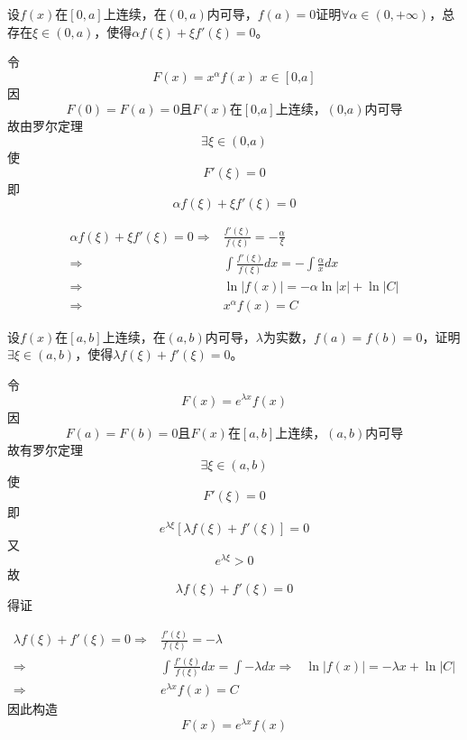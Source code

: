 \begin{example}
	设$f(x)$在$[0,a]$上连续，在$(0,a)$内可导，$f(a)=0$证明$\forall\alpha\in(0,+\infty)$，总存在$\xi\in(0,a)$，使得$\alpha f(\xi)+\xi f'(\xi)=0$。
\end{example}
	\begin{newproof}
		令\[F\left( x \right) =x^{\alpha}f\left( x \right) \,\,      x\in \left[ \text{0,}a \right] \]
		因\[F\left( 0 \right) =F\left( a \right) =\text{0且}F\left( x \right) \text{在}\left[ \text{0,}a \right] \text{上连续，}\left( \text{0,}a \right) \text{内可导}\]
		故由罗尔定理\[\exists \xi \in \left( \text{0,}a \right) \]
		使\[F'\left( \xi \right) =0\]
		即\[\alpha f\left( \xi \right) +\xi f'\left( \xi \right) =0\]
	\end{newproof}
	\begin{note}
		\begin{align*}
			\alpha f\left( \xi \right) +\xi f'\left( \xi \right) =0
			\Longrightarrow {}&	
			\frac{f'\left( \xi \right)}{f\left( \xi \right)}=-\frac{\alpha}{\xi}\\
			\Longrightarrow {}&	
			\int{\frac{f'\left( \xi \right)}{f\left( \xi \right)}dx}=-\int{\frac{\alpha}{x}dx}\\
			\Longrightarrow {}&	
			\ln\text{|}f\left( x \right) |=-\alpha \ln\text{|}x|+\ln\text{|}C|\\
			\Longrightarrow {}&	
			x^{\alpha}f\left( x \right) =C	
		\end{align*}
	\end{note}

\begin{example}
	设$f(x)$在$[a,b]$上连续，在$(a,b)$内可导，$\lambda$为实数，$f(a)=f(b)=0$，证明$\exists\xi\in(a,b)$，使得$\lambda f(\xi)+f'(\xi)=0$。
\end{example}
	\begin{newproof}
		令\[F\left( x \right) =e^{\lambda x}f\left( x \right) \]
		因\[F\left( a \right) =F\left( b \right) =\text{0且}F\left( x \right) \text{在}\left[ a,b \right] \text{上连续，}\left( a,b \right) \text{内可导}\]
		故有罗尔定理\[\exists \xi \in \left( a,b \right) \]
		使\[F'\left( \xi \right) =0\]
		即\[e^{\lambda \xi}\left[ \lambda f\left( \xi \right) +f'\left( \xi \right) \right] =0\]
		又\[e^{\lambda \xi}>0\]
		故\[\lambda f\left( \xi \right) +f'\left( \xi \right) =0\]
		得证
	\end{newproof}
	\begin{note}
		\begin{align*}
			\lambda f\left( \xi \right) +f'\left( \xi \right) =0
			\Longrightarrow {}&
			\frac{f'\left( \xi \right)}{f\left( \xi \right)}=-\lambda \\
			\Longrightarrow {}&
			\int{\frac{f'\left( \xi \right)}{f\left( \xi \right)}dx}=\int{-\lambda dx}
			\Longrightarrow {}&
			\ln\text{|}f\left( x \right) |=-\lambda x+\ln\text{|}C|\\
			\Longrightarrow {}&
			e^{\lambda x}f\left( x \right) =C
		\end{align*}
		因此构造\[F\left( x \right) =e^{\lambda x}f\left( x \right) \]
	\end{note}
	

